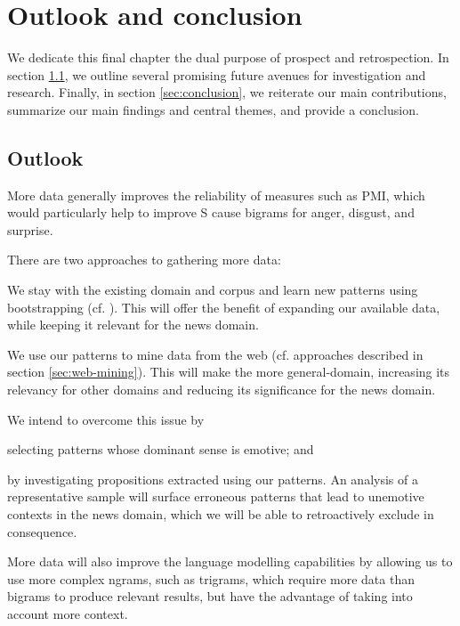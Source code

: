 
\chapter{Outlook and conclusion} %

\label{ch:outlook-conclusion}

We dedicate this final chapter the dual purpose of prospect and retrospection. In section \ref{sec:outlook}, we outline several promising future avenues for investigation and research. Finally, in section \ref{sec:conclusion}, we reiterate our main contributions, summarize our main findings and central themes, and provide a conclusion.

\section{Outlook} \label{sec:outlook}

More data generally improves the reliability of measures such as PMI, which would particularly help to improve S cause bigrams for anger, disgust, and surprise. \begin{inparaenum} There are two approaches to gathering more data: \item We stay with the existing domain and corpus and learn new patterns using bootstrapping (cf.  \cite{harvesting_ontologizing}). This will offer the benefit of expanding our available data, while keeping it relevant for the news domain. \item We use our patterns to mine data from the web  (cf. approaches described in section \ref{sec:web-mining}). This will make the more general-domain, increasing its relevancy for other domains and reducing its significance for the news domain. \end{inparaenum}

\begin{inparaenum} We intend to overcome this issue by \item selecting patterns whose dominant sense is emotive; and \item by investigating propositions extracted using our patterns. An analysis of a representative sample will surface erroneous patterns that lead to unemotive contexts in the news domain, which we will be able to retroactively exclude in consequence. \end{inparaenum}

More data will also improve the language modelling capabilities by allowing us to use more complex ngrams, such as trigrams, which require more data than bigrams to produce relevant results, but have the advantage of taking into account more context.

